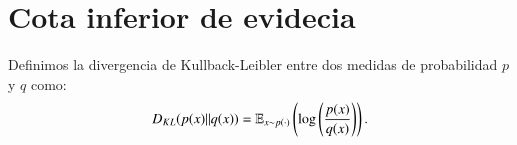 \documentclass[
	spanish, %
	letterpaper, oneside
]{article}
\begin{document}
\templatePortrait

\templatePagecfg



\templateFinalcfg


\section*{Cota inferior de evidecia}
Definimos la divergencia de Kullback-Leibler entre dos medidas de probabilidad \(p\) y \(q\) como:
\[D_{KL}(p(x)||q(x))=\mathbb{E}_{x\sim p(\cdot)}\left(\log\left(\frac{p(x)}{q(x)}\right)\right).\]
\end{document}
